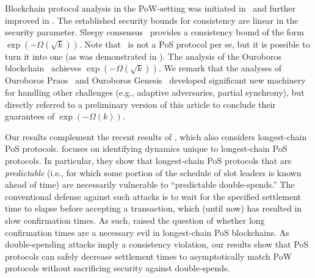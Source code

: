 Blockchain protocol analysis in the PoW-setting was initiated
in~\cite{DBLP:conf/eurocrypt/GarayKL15} and further improved in
\cite{DBLP:conf/eurocrypt/PassSS17,DBLP:conf/crypto/GarayKL17}.  The
established security bounds for consistency are linear in the security
parameter.  Sleepy
consensus~\cite[Theorem~13]{DBLP:conf/asiacrypt/PassS17} provides a
consistency bound of the form
$\exp(-\Omega(\sqrt{k}))$. %
Note that~\cite{DBLP:conf/asiacrypt/PassS17} is not a PoS protocol per
se, but it is possible to turn it into one (as was demonstrated in
\cite{DBLP:journals/iacr/BentovPS16a}). The analysis of the Ouroboros
blockchain~\cite{KRDO17} achieves $\exp(-\Omega(\sqrt{k}))$. We remark
that the analyses of Ouroboros
Praos~\cite{DBLP:conf/eurocrypt/DavidGKR18} and Ouroboros
Genesis~\cite{DBLP:journals/iacr/BadertscherGKRZ18} developed
significant new machinery for handling other challenges (e.g.,
adaptive adversaries, partial synchrony), but directly referred to a
preliminary version of this article to conclude their guarantees of
$ \exp(-\Omega(k))$.




Our results complement the recent results of
\cite{DBLP:journals/corr/abs-1809-06528}, which also considers
longest-chain PoS protocols. \cite{DBLP:journals/corr/abs-1809-06528}
focuses on identifying dynamics unique to longest-chain PoS
protocols. In particular, they show that longest-chain PoS protocols
that are \emph{predictable} (i.e., for which some portion of the
schedule of slot leaders is known ahead of time) are necessarily
vulnerable to ``predictable double-spends.''  The conventional defense
against such attacks is to wait for the specified settlement time to
elapse before accepting a transaction, which (until now) has resulted
in slow confirmation times. As such,
\cite{DBLP:journals/corr/abs-1809-06528} raised the question of
whether long confirmation times are a necessary evil in longest-chain
PoS blockchains.  As double-spending attacks imply a consistency
violation, our results show that PoS protocols can safely decrease
settlement times to asymptotically match PoW protocols without
sacrificing security against double-spends.

